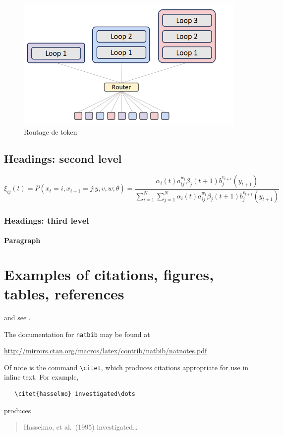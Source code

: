 \documentclass{article}
\begin{document}
\begin{figure}[h]
  \centering
  \includegraphics[scale=0.5]{images/token_choice_routing.png}
  \caption{Routage de token \cite{bae2025mixtureofrecursionslearningdynamicrecursive}}
  \label{fig:token-choice-routing}
\end{figure}


\subsection{Headings: second level}
\lipsum[5]
\begin{equation}
\xi _{ij}(t)=P(x_{t}=i,x_{t+1}=j|y,v,w;\theta)= {\frac {\alpha _{i}(t)a^{w_t}_{ij}\beta _{j}(t+1)b^{v_{t+1}}_{j}(y_{t+1})}{\sum _{i=1}^{N} \sum _{j=1}^{N} \alpha _{i}(t)a^{w_t}_{ij}\beta _{j}(t+1)b^{v_{t+1}}_{j}(y_{t+1})}}
\end{equation}

\subsubsection{Headings: third level}
\lipsum[6]

\paragraph{Paragraph}
\lipsum[7]

\section{Examples of citations, figures, tables, references}
\label{sec:others}
\lipsum[8] \cite{kour2014real,kour2014fast} and see \cite{hadash2018estimate}.

The documentation for \verb+natbib+ may be found at
\begin{center}
  \url{http://mirrors.ctan.org/macros/latex/contrib/natbib/natnotes.pdf}
\end{center}
Of note is the command \verb+\citet+, which produces citations
appropriate for use in inline text.  For example,
\begin{verbatim}
   \citet{hasselmo} investigated\dots
\end{verbatim}
produces
\begin{quote}
  Hasselmo, et al.\ (1995) investigated\dots
\end{quote}
\end{document}
